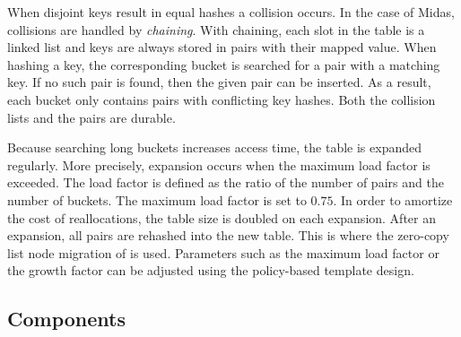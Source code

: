 When disjoint keys result in equal hashes a collision occurs. In the case of
Midas, collisions are handled by \emph{chaining}. With chaining, each slot in
the table is a linked list and keys are always stored in pairs with their mapped
value. When hashing a key, the corresponding bucket is searched for a pair with
a matching key. If no such pair is found, then the given pair can be inserted.
As a result, each bucket only contains pairs with conflicting key hashes. Both
the collision lists and the pairs are durable.

Because searching long buckets increases access time, the table is expanded
regularly. More precisely, expansion occurs when the maximum load factor is
exceeded. The load factor is defined as the ratio of the number of pairs and the
number of buckets. The maximum load factor is set to $0.75$. In order to
amortize the cost of reallocations, the table size is doubled on each expansion.
After an expansion, all pairs are rehashed into the new table. This is where the
zero-copy list node migration of  is used. Parameters such as the
maximum load factor or the growth factor can be adjusted using the policy-based
template design.




\newpage

\subsection{Components}
\label{ch:impl-components}

